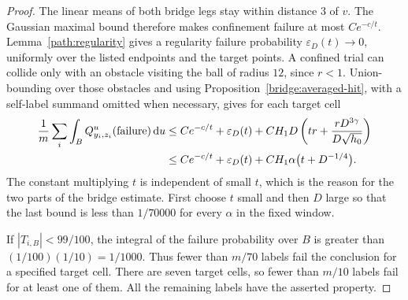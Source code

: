 \begin{proof}
The linear means of both bridge legs stay within distance $3$ of $v$.
The Gaussian maximal bound therefore makes confinement failure at
most $Ce^{-c/t}$.  Lemma~\ref{path:regularity} gives a regularity
failure probability $\varepsilon_D(t)\to0$, uniformly over the listed
endpoints and the target points.  A confined trial can collide only
with an obstacle visiting the ball of radius $12$, since $r<1$.
Union-bounding over those obstacles and using
Proposition~\ref{bridge:averaged-hit}, with a self-label summand
omitted when necessary, gives for each target cell
\begin{align}
 \frac1m\sum_i\int_B
 Q_{y_i,z_i}^{u}(\text{failure})\,\mathrm d u
 &\le Ce^{-c/t}+\varepsilon_D(t)
       +CH_1D\left(tr+\frac{rD^{3\gamma}}{D\sqrt{h_0}}\right)
 \notag\\
 &\le Ce^{-c/t}+\varepsilon_D(t)
       +CH_1\alpha\bigl(t+D^{-1/4}\bigr).
 \label{bridge:total-failure}
\end{align}
The constant multiplying $t$ is independent of small $t$, which is
the reason for the two parts of the bridge estimate.  First choose
$t$ small and then $D$ large so that the last bound is less than
$1/70000$ for every $\alpha$ in the fixed window.

If $|T_{i,B}|<99/100$, the integral of the failure probability over
$B$ is greater than $(1/100)(1/10)=1/1000$.  Thus fewer than
$m/70$ labels fail the conclusion for a specified target cell.
There are seven target cells, so fewer than $m/10$ labels fail for
at least one of them.  All the remaining labels have the asserted
property.
\end{proof}
